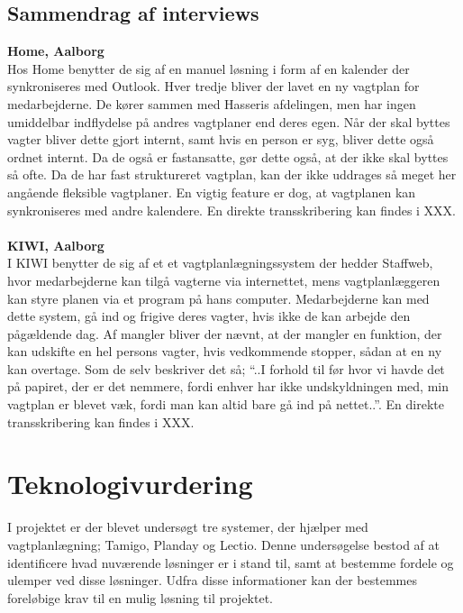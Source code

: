 \subsection{Sammendrag af interviews}
\textbf{Home, Aalborg} \\
Hos Home benytter de sig af en manuel løsning i form af en kalender der synkroniseres med Outlook. Hver tredje bliver der lavet en ny vagtplan for medarbejderne. De kører sammen med Hasseris afdelingen, men har ingen umiddelbar indflydelse på andres vagtplaner end deres egen. Når der skal byttes vagter bliver dette gjort internt, samt hvis en person er syg, bliver dette også ordnet internt. Da de også er fastansatte, gør dette også, at der ikke skal byttes så ofte.
Da de har fast struktureret vagtplan, kan der ikke uddrages så meget her angående fleksible vagtplaner. En vigtig feature er dog, at vagtplanen kan synkroniseres med andre kalendere.
En direkte transskribering kan findes i XXX.\\\\
\textbf{KIWI, Aalborg}\\
I KIWI benytter de sig af et et vagtplanlægningssystem der hedder Staffweb, hvor medarbejderne kan tilgå vagterne via internettet, mens vagtplanlæggeren kan styre planen via et program på hans computer. Medarbejderne kan med dette system, gå ind og frigive deres vagter, hvis ikke de kan arbejde den pågældende dag.
Af mangler bliver der nævnt, at der mangler en funktion, der kan udskifte en hel persons vagter, hvis vedkommende stopper, sådan at en ny kan overtage.
Som de selv beskriver det så; “..I forhold til før hvor vi havde det på papiret, der er det nemmere, fordi enhver har ikke undskyldningen med, min vagtplan er blevet væk, fordi man kan altid bare gå ind på nettet..”.
En direkte transskribering kan findes i XXX.


\section{Teknologivurdering}
I projektet er der blevet undersøgt tre systemer, der hjælper med vagtplanlægning; Tamigo, Planday og Lectio. Denne undersøgelse bestod af at identificere hvad nuværende løsninger er i stand til, samt at bestemme fordele og ulemper ved disse løsninger. Udfra disse informationer kan der bestemmes foreløbige krav til en mulig løsning til projektet.
